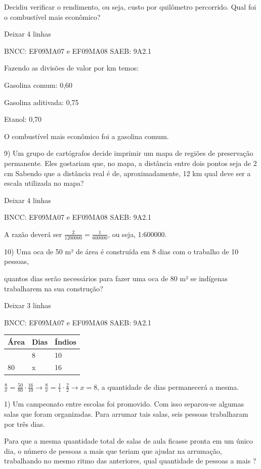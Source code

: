 \begin{escolha}
{{{\begin{escolha}
{Decidiu verificar o rendimento, ou seja, custo por quilômetro
percorrido. Qual foi o combustível mais econômico?

Deixar 4 linhas

BNCC: EF09MA07 e EF09MA08 SAEB: 9A2.1

Fazendo as divisões de valor por km temos:

Gasolina comum: 0,60

Gasolina aditivada: 0,75

Etanol: 0,70

O combustível mais econômico foi a gasolina comum.

9) Um grupo de cartógrafos decide imprimir um mapa de regiões de
preservação permanente. Eles gostariam que, no mapa, a distância entre
dois pontos seja de 2 cm Sabendo que a distância real é de,
aproximadamente, 12 km qual deve ser a escala utilizada no mapa?

Deixar 4 linhas

BNCC: EF09MA07 e EF09MA08 SAEB: 9A2.1

A razão deverá ser \(\frac{2}{1200000} = \frac{1}{600000}\), ou seja,
1:600000.

10) Uma oca de 50 m² de área é construída em 8 dias com o trabalho de 10
pessoas,

quantos dias serão necessários para fazer uma oca de 80 m² se indígenas
trabalharem na sua construção?

Deixar 3 linhas

BNCC: EF09MA07 e EF09MA08 SAEB: 9A2.1

\begin{longtable}[]{@{}lll@{}}
\toprule\noalign{}
Área & Dias & Índios \\
\midrule\noalign{}
\endhead
\bottomrule\noalign{}
\endlastfoot
50 & 8 & 10 \\
80 & x & 16 \\
\end{longtable}

\(\frac{8}{x} = \frac{50}{80} \cdot \frac{16}{10} \rightarrow \frac{8}{x} = \frac{1}{1} \cdot \frac{2}{2} \rightarrow x = 8\),
a quantidade de dias permanecerá a mesma.


1) Um campeonato entre escolas foi promovido. Com isso separou-se
algumas salas que foram organizadas. Para arrumar tais salas, seis
pessoas trabalharam por três dias.

Para que a mesma quantidade total de salas de aula ficasse pronta em um
único dia, o número de pessoas a mais que teriam que ajudar na
arrumação, trabalhando no mesmo ritmo das anteriores, qual quantidade de
pessoas a mais ?

}
\end{escolha}}}}
\end{escolha}
